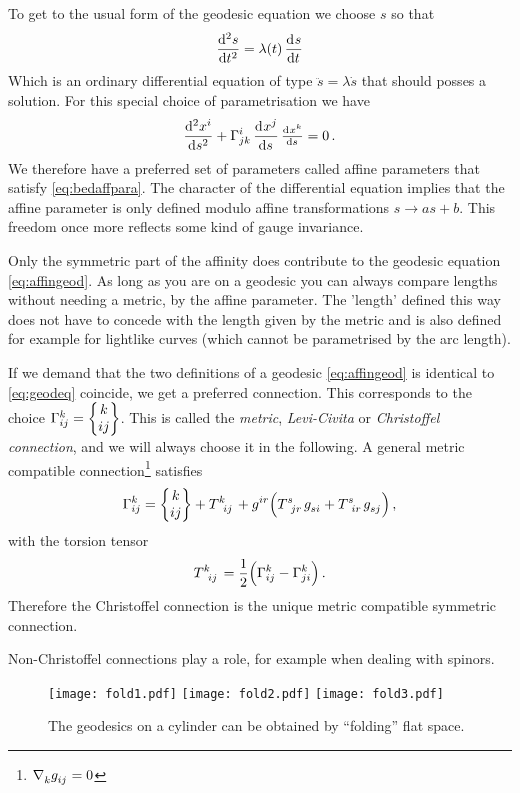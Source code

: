 To get to the usual form of the geodesic equation we choose $s$ so that
\begin{equation}
\dod[2]{s}{t}=\lambda(t)\dod{s}{t}\label{eq:bedaffpara}
\end{equation}
Which is an ordinary differential equation of type $\ddot{s}=\lambda\dot{s}$
that should posses a solution. 
For this special choice of parametrisation we have
\begin{equation}
\dod[2]{\tensor{x}{^i}}{s}+\affin{i}{j}{k}\dod{\tensor{x}{^j}}{s}\od{\tensor{x}{^k}}{s}
=0\,.\label{eq:affingeod}
\end{equation}
We therefore have a preferred set of parameters
called affine parameters that satisfy \eqref{eq:bedaffpara}. The character
of the differential equation implies that the affine parameter is only
defined modulo affine transformations $s\to as+b$. This freedom once more
reflects some kind of gauge invariance.
\begin{remark}
Only the symmetric part of the affinity does contribute to
the geodesic equation \eqref{eq:affingeod}. As long as you are on a geodesic you
can always compare lengths without needing a metric, by the affine parameter.
The 'length' defined this way does not have to concede with the length given by
the metric and is also defined for example for lightlike curves (which cannot
be parametrised by the arc length).
\end{remark}
If we demand that the two definitions of a geodesic \eqref{eq:affingeod} is
identical to \eqref{eq:geodeq} coincide, we get a preferred
connection.
This corresponds to the choice $\Gamma^{k}_{i j}=\begin{Bmatrix} k \\ i j \end{Bmatrix}$.
This is called the \emph{metric}, \emph{Levi-Civita} or \emph{Christoffel
connection}, and we will always choose it in the following.
A general metric compatible
connection\footnote{$\tensor{\nabla}{_k}\tensor{g}{_i_j}=0$} satisfies
\begin{equation}
\affin{k}{i}{j}=\cSym{k}{i}{j}+\tensor{T}{^k_i_j}
+\tensor{g}{^i^r}\left(\tensor{T}{^s_j_r}\tensor{g}{_s_i}+\tensor{T}{^s_i_r}\tensor{g}{_s_j}\right)\,,
\end{equation}
with the torsion tensor
\begin{equation}
\tensor{T}{^k_i_j}=\frac{1}{2}\left(\affin{k}{i}{j}-\affin{k}{j}{i}\right)\,.
\end{equation}
Therefore the Christoffel connection is the unique metric compatible
symmetric connection.
\begin{remark}
Non-Christoffel connections play a role, for example when dealing with spinors.
\end{remark}
\begin{figure}[hbtp!]
\centering
 \texttt{[image: fold1.pdf]}\qquad\qquad
 \texttt{[image: fold2.pdf]}\qquad\qquad
 \texttt{[image: fold3.pdf]}
\caption{The geodesics on a cylinder can be obtained by ``folding'' flat space.}
\end{figure}

